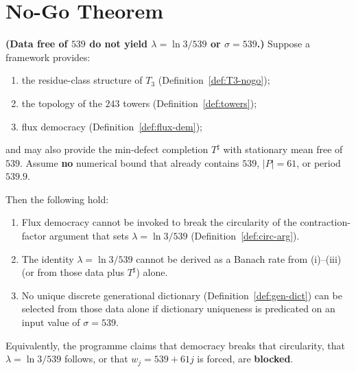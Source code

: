 \section{No-Go Theorem}
\label{sec:nogo}

\begin{theorem}
\label{thm:nogo-main}
\textbf{(Data free of \(539\) do not yield \(\lambda=\ln 3/539\) or \(\sigma=539\).)}
\newline
Suppose a framework provides:
\begin{enumerate}[label=(\roman*)]
  \item the residue-class structure of \(T_3\) (Definition~\ref{def:T3-nogo});
  \item the topology of the \(243\) towers (Definition~\ref{def:towers});
  \item flux democracy (Definition~\ref{def:flux-dem});
\end{enumerate}
and may also provide the min-defect completion \(T^\sharp\) with stationary mean
free of \(539\). Assume \textbf{no} numerical bound that already contains
\(539\), \(|P|=61\), or period \(539.9\).

Then the following hold:
\begin{enumerate}[label=(\alph*)]
  \item Flux democracy cannot be invoked to break the circularity of the
        contraction-factor argument that sets \(\lambda=\ln 3/539\)
        (Definition~\ref{def:circ-arg}).
  \item The identity \(\lambda=\ln 3/539\) cannot be derived as a Banach rate
        from (i)--(iii) (or from those data plus \(T^\sharp\)) alone.
  \item No unique discrete generational dictionary
        (Definition~\ref{def:gen-dict}) can be selected from those data alone
        if dictionary uniqueness is predicated on an input value of
        \(\sigma=539\).
\end{enumerate}
Equivalently, the programme claims that democracy breaks that circularity,
that \(\lambda=\ln 3/539\) follows, or that \(w_j=539+61j\) is forced, are
\textbf{blocked}.
\end{theorem}

